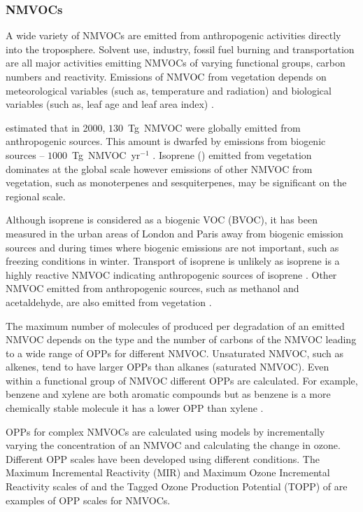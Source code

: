 \subsubsection{NMVOCs}
A wide variety of NMVOCs are emitted from anthropogenic activities directly into the troposphere.
Solvent use, industry, fossil fuel burning and transportation are all major activities emitting NMVOCs of varying functional groups, carbon numbers and reactivity.
Emissions of NMVOC from vegetation depends on meteorological variables (such as, temperature and radiation) and biological variables (such as, leaf age and leaf area index) \citep{Guenther:2012}.

\citet{Lamarque:2010} estimated that in 2000, $130$~Tg~NMVOC were globally emitted from anthropogenic sources.
This amount is dwarfed by emissions from biogenic sources -- $1000$~Tg~NMVOC~yr$^{-1}$ \citep{Guenther:2012}.
Isoprene () emitted from vegetation dominates at the global scale however emissions of other NMVOC from vegetation, such as monoterpenes and sesquiterpenes, may be significant on the regional scale.

Although isoprene is considered as a biogenic VOC (BVOC), it has been measured in the urban areas of London and Paris away from biogenic emission sources and during times where biogenic emissions are not important, such as freezing conditions in winter.
Transport of isoprene is unlikely as isoprene is a highly reactive NMVOC indicating anthropogenic sources of isoprene \citep{vonSchneidemesser:2011}.
Other NMVOC emitted from anthropogenic sources, such as methanol and acetaldehyde, are also emitted from vegetation \citep{Guenther:2012}.

The maximum number of molecules of  produced per degradation of an emitted NMVOC depends on the type and the number of carbons of the NMVOC leading to a wide range of OPPs for different NMVOC.
Unsaturated NMVOC, such as alkenes, tend to have larger OPPs than alkanes (saturated NMVOC).
Even within a functional group of NMVOC different OPPs are calculated.
For example, benzene and xylene are both aromatic compounds but as benzene is a more chemically stable molecule it has a lower OPP than xylene \citep{Carter:1994}.

OPPs for complex NMVOCs are calculated using models by incrementally varying the concentration of an NMVOC and calculating the change in ozone.
Different OPP scales have been developed using different  conditions.
The Maximum Incremental Reactivity (MIR) and Maximum Ozone Incremental Reactivity scales of \citet{Carter:1994} and the Tagged Ozone Production Potential (TOPP) of \citet{Butler:2011} are examples of OPP scales for NMVOCs.

